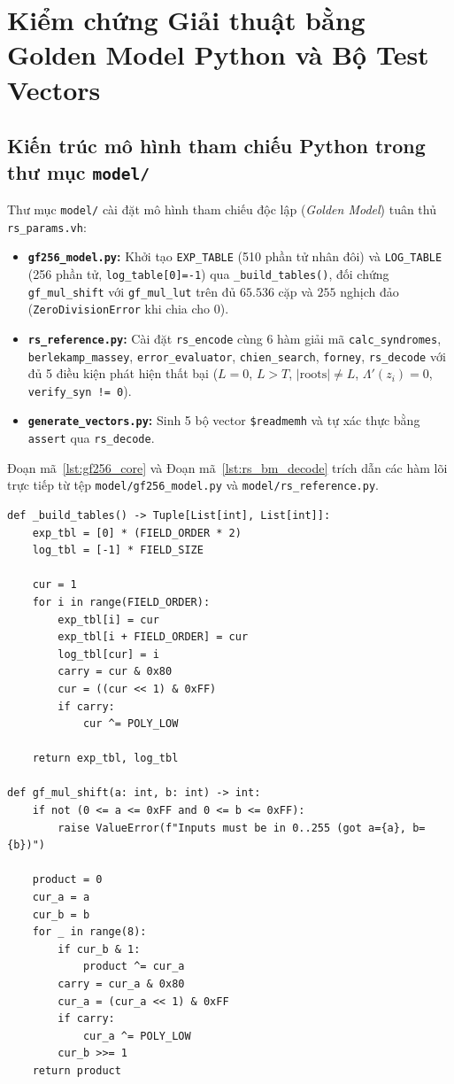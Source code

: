 \documentclass[11pt,a4paper]{report}
\begin{document}
\section{Kiểm chứng Giải thuật bằng Golden Model Python và Bộ Test Vectors}

\subsection{Kiến trúc mô hình tham chiếu Python trong thư mục \texttt{model/}}

Thư mục \texttt{model/} cài đặt mô hình tham chiếu độc lập (\textit{Golden Model}) tuân thủ \texttt{rs\_params.vh}:
\begin{itemize}
    \item \textbf{\texttt{gf256\_model.py}:} Khởi tạo \texttt{EXP\_TABLE} (510 phần tử nhân đôi) và \texttt{LOG\_TABLE} (256 phần tử, \texttt{log\_table[0]=-1}) qua \texttt{\_build\_tables()}, đối chứng \texttt{gf\_mul\_shift} với \texttt{gf\_mul\_lut} trên đủ $65.536$ cặp và $255$ nghịch đảo (\texttt{ZeroDivisionError} khi chia cho $0$).
    \item \textbf{\texttt{rs\_reference.py}:} Cài đặt \texttt{rs\_encode} cùng 6 hàm giải mã \texttt{calc\_syndromes}, \texttt{berlekamp\_massey}, \texttt{error\_evaluator}, \texttt{chien\_search}, \texttt{forney}, \texttt{rs\_decode} với đủ 5 điều kiện phát hiện thất bại ($L=0$, $L>T$, $|\text{roots}|\neq L$, $\Lambda'(z_i)=0$, \texttt{verify\_syn != 0}).
    \item \textbf{\texttt{generate\_vectors.py}:} Sinh 5 bộ vector \texttt{\$readmemh} và tự xác thực bằng \texttt{assert} qua \texttt{rs\_decode}.
\end{itemize}

Đoạn mã~\ref{lst:gf256_core} và Đoạn mã~\ref{lst:rs_bm_decode} trích dẫn các hàm lõi trực tiếp từ tệp \texttt{model/\allowbreak gf256\_model.py} và \texttt{model/\allowbreak rs\_reference.py}.

\begin{lstlisting}[style=pythonstyle, caption={Tạo bảng log/exp và phép nhân đối chứng trong \texttt{model/gf256\_model.py}}, label={lst:gf256_core}]
def _build_tables() -> Tuple[List[int], List[int]]:
    exp_tbl = [0] * (FIELD_ORDER * 2)
    log_tbl = [-1] * FIELD_SIZE

    cur = 1
    for i in range(FIELD_ORDER):
        exp_tbl[i] = cur
        exp_tbl[i + FIELD_ORDER] = cur
        log_tbl[cur] = i
        carry = cur & 0x80
        cur = ((cur << 1) & 0xFF)
        if carry:
            cur ^= POLY_LOW

    return exp_tbl, log_tbl

def gf_mul_shift(a: int, b: int) -> int:
    if not (0 <= a <= 0xFF and 0 <= b <= 0xFF):
        raise ValueError(f"Inputs must be in 0..255 (got a={a}, b={b})")

    product = 0
    cur_a = a
    cur_b = b
    for _ in range(8):
        if cur_b & 1:
            product ^= cur_a
        carry = cur_a & 0x80
        cur_a = (cur_a << 1) & 0xFF
        if carry:
            cur_a ^= POLY_LOW
        cur_b >>= 1
    return product
\end{lstlisting}
\end{document}
